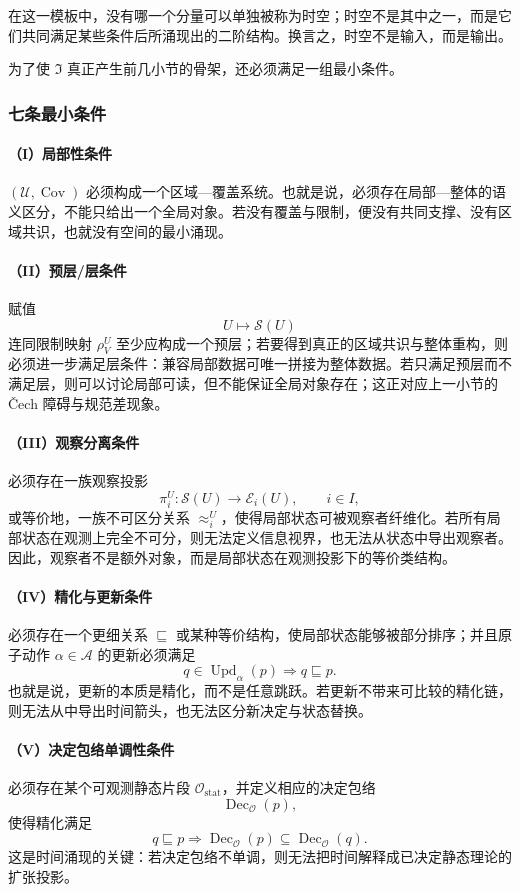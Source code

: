 在这一模板中，没有哪一个分量可以单独被称为时空；时空不是其中之一，而是它们共同满足某些条件后所涌现出的二阶结构。换言之，时空不是输入，而是输出。

为了使 \(\mathfrak I\) 真正产生前几小节的骨架，还必须满足一组最小条件。

\subsubsection{七条最小条件}

\paragraph{（I）局部性条件}
\((\mathcal U,\operatorname{Cov})\) 必须构成一个区域—覆盖系统。也就是说，必须存在局部—整体的语义区分，不能只给出一个全局对象。若没有覆盖与限制，便没有共同支撑、没有区域共识，也就没有空间的最小涌现。

\paragraph{（II）预层/层条件}
赋值
\[
U\longmapsto \mathcal S(U)
\]
连同限制映射 \(\rho^U_V\) 至少应构成一个预层；若要得到真正的区域共识与整体重构，则必须进一步满足层条件：兼容局部数据可唯一拼接为整体数据。若只满足预层而不满足层，则可以讨论局部可读，但不能保证全局对象存在；这正对应上一小节的 Čech 障碍与规范差现象。

\paragraph{（III）观察分离条件}
必须存在一族观察投影
\[
\pi_i^U:\mathcal S(U)\to \mathcal E_i(U),\qquad i\in I,
\]
或等价地，一族不可区分关系 \(\approx_i^U\)，使得局部状态可被观察者纤维化。若所有局部状态在观测上完全不可分，则无法定义信息视界，也无法从状态中导出观察者。因此，观察者不是额外对象，而是局部状态在观测投影下的等价类结构。

\paragraph{（IV）精化与更新条件}
必须存在一个更细关系 \(\sqsubseteq\) 或某种等价结构，使局部状态能够被部分排序；并且原子动作 \(\alpha\in\mathcal A\) 的更新必须满足
\[
q\in \operatorname{Upd}_\alpha(p)\Longrightarrow q\sqsubseteq p.
\]
也就是说，更新的本质是精化，而不是任意跳跃。若更新不带来可比较的精化链，则无法从中导出时间箭头，也无法区分新决定与状态替换。

\paragraph{（V）决定包络单调性条件}
必须存在某个可观测静态片段 \(\mathcal O_{\mathrm{stat}}\)，并定义相应的决定包络
\[
\operatorname{Dec}_{\mathcal O}(p),
\]
使得精化满足
\[
q\sqsubseteq p
\Longrightarrow
\operatorname{Dec}_{\mathcal O}(p)\subseteq \operatorname{Dec}_{\mathcal O}(q).
\]
这是时间涌现的关键：若决定包络不单调，则无法把时间解释成已决定静态理论的扩张投影。

